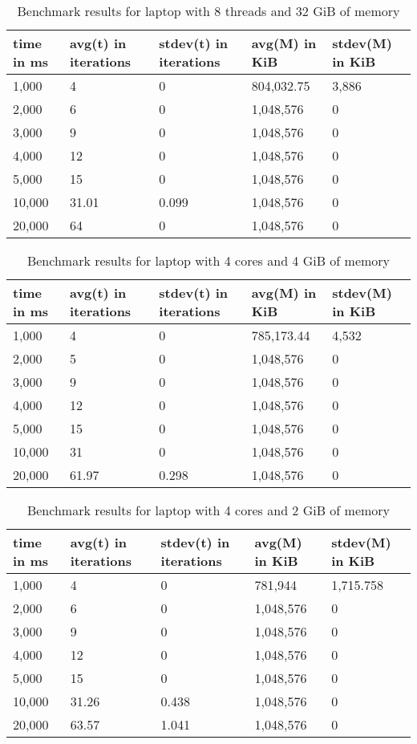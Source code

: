 \documentclass[nolof,digital]{fithesis3}
\begin{document}
\noindent
\begin{table}
\caption{Benchmark results for laptop with 8 threads and 32 GiB of memory}
\label{tab:l8c32g}
\begin{tabularx}{\textwidth}{| X | X | X | X | X |}
\hline
time in ms & avg(t) in iterations & stdev(t) in iterations & avg(M) in KiB & stdev(M) in KiB\\
\hline
1,000 & 4 & 0 & 804,032.75 & 3,886\\
\hline
2,000 & 6 & 0 & 1,048,576 & 0\\
\hline
3,000 & 9 & 0 & 1,048,576 & 0\\
\hline
4,000 & 12 & 0 & 1,048,576 & 0\\
\hline
5,000 & 15 & 0 & 1,048,576 & 0\\
\hline
10,000 & 31.01 & 0.099 & 1,048,576 & 0\\
\hline
20,000 & 64 & 0 & 1,048,576 & 0\\
\hline
\end{tabularx}
\end{table}

\noindent
\begin{table}
\caption{Benchmark results for laptop with 4 cores and 4 GiB of memory}
\label{tab:l4c4g}
\begin{tabularx}{\textwidth}{| X | X | X | X | X |}
\hline
time in ms & avg(t)  in iterations & stdev(t) in iterations & avg(M) in KiB & stdev(M) in KiB\\
\hline
1,000 & 4 & 0 & 785,173.44 & 4,532\\
\hline
2,000 & 5 & 0 & 1,048,576 & 0\\
\hline
3,000 & 9 & 0 & 1,048,576 & 0\\
\hline
4,000 & 12 & 0 & 1,048,576 & 0\\
\hline
5,000 & 15 & 0 & 1,048,576 & 0\\
\hline
10,000 & 31 & 0 & 1,048,576 & 0\\
\hline
20,000 & 61.97 & 0.298 & 1,048,576 & 0\\
\hline
\end{tabularx}
\end{table}

\noindent
\begin{table}
\caption{Benchmark results for laptop with 4 cores and 2 GiB of memory}
\label{tab:l4c2g}
\begin{tabularx}{\textwidth}{| X | X | X | X | X |}
\hline
time in ms & avg(t)  in iterations & stdev(t) in iterations & avg(M) in KiB & stdev(M) in KiB\\
\hline
1,000 & 4 & 0 & 781,944 & 1,715.758\\
\hline
2,000 & 6 & 0 & 1,048,576 & 0\\
\hline
3,000 & 9 & 0 & 1,048,576 & 0\\
\hline
4,000 & 12 & 0 & 1,048,576 & 0\\
\hline
5,000 & 15 & 0 & 1,048,576 & 0\\
\hline
10,000 & 31.26 & 0.438 & 1,048,576 & 0\\
\hline
20,000 & 63.57 & 1.041 & 1,048,576 & 0\\
\hline
\end{tabularx}
\end{table}
\end{document}
